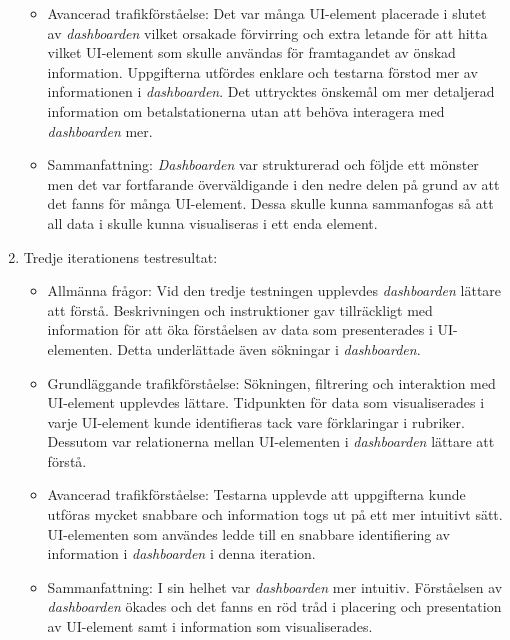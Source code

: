 \documentclass[12pt]{kththesis}
\begin{document}
\begin{enumerate}
\begin{itemize}
\item Avancerad trafikförståelse: Det var många UI-element placerade i slutet av \textit{dashboarden} vilket orsakade förvirring och extra letande för att hitta vilket UI-element som skulle användas för framtagandet av önskad information. Uppgifterna utfördes enklare och testarna förstod mer av informationen i \textit{dashboarden}. Det uttrycktes önskemål om mer detaljerad information om betalstationerna utan att behöva interagera med \textit{dashboarden} mer.

\item Sammanfattning: \textit{Dashboarden} var strukturerad och följde ett mönster men det var fortfarande överväldigande i den nedre delen på grund av att det fanns för många UI-element. Dessa skulle kunna sammanfogas så att all data i skulle kunna visualiseras i ett enda element.
\end{itemize}

\item Tredje iterationens testresultat: 

\begin{itemize}
\item Allmänna frågor: Vid den tredje testningen upplevdes \textit{dashboarden} lättare att förstå. Beskrivningen och instruktioner gav tillräckligt med information för att öka förståelsen av data som presenterades i UI-elementen. Detta underlättade även sökningar i \textit{dashboarden}. 

\item Grundläggande trafikförståelse: Sökningen, filtrering och interaktion med UI-element upplevdes lättare. Tidpunkten för data som visualiserades i varje UI-element kunde identifieras tack vare förklaringar i rubriker. Dessutom var relationerna mellan UI-elementen i \textit{dashboarden} lättare att förstå.

\item Avancerad trafikförståelse: Testarna upplevde att uppgifterna kunde utföras mycket snabbare och information togs ut på ett mer intuitivt sätt. UI-elementen som användes ledde till en snabbare identifiering av information i \textit{dashboarden} i denna iteration. 

\item Sammanfattning: I sin helhet var \textit{dashboarden} mer intuitiv. Förståelsen av \textit{dashboarden} ökades och det fanns en röd tråd i placering och presentation av UI-element samt i information som visualiserades. 
\end{itemize}
\end{enumerate}
\end{document}

